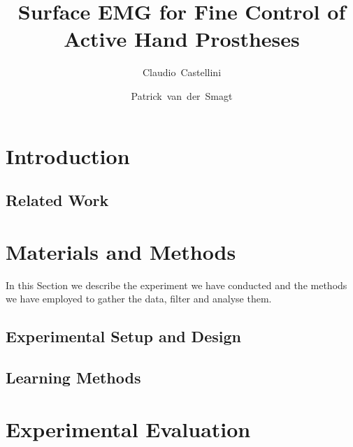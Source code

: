 \documentclass[twocolumn,referee]{svjour2}
\begin{document}
\title{Surface EMG for Fine Control of Active Hand Prostheses}

\author{Claudio~Castellini \and Patrick~van~der~Smagt}

\maketitle

\begin{abstract}
  
\end{abstract}


\section{Introduction}
\label{sec:introduction}


\subsection{Related Work}
\label{subsec:relatedwork}


\section{Materials and Methods}
\label{sec:m&ms}

In this Section we describe the experiment we have conducted and the
methods we have employed to gather the data, filter and analyse them.

\subsection{Experimental Setup and Design}
\label{subsec:setup}


\subsection{Learning Methods}
\label{subsec:analysis}


\section{Experimental Evaluation}
\label{sec:exp}
\end{document}
